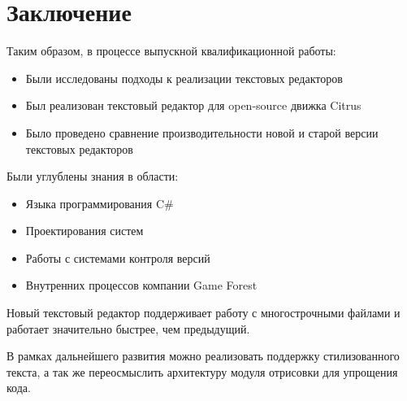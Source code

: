 \documentclass{fefu}
\begin{document}
	\section*{Заключение}
		\par Таким образом, в процессе выпускной квалификационной работы:
		\begin{itemize}
			\item Были исследованы подходы к реализации текстовых редакторов
			\item Был реализован текстовый редактор для open-source движка Citrus
			\item Было проведено сравнение производительности новой и старой версии текстовых
			редакторов
		\end{itemize}
		\par Были углублены знания в области:
		\begin{itemize}
			\item Языка программирования C\#
			\item Проектирования систем
			\item Работы с системами контроля версий
			\item Внутренних процессов компании Game Forest
		\end{itemize}
		\par Новый текстовый редактор поддерживает работу с многострочными файлами и работает
		значительно быстрее, чем предыдущий.
		\par В рамках дальнейшего развития можно реализовать поддержку стилизованного текста,
		а так же переосмыслить архитектуру модуля отрисовки для упрощения кода.
	\newpage
	
		
\end{document}
